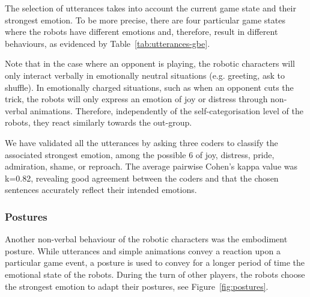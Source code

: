The selection of utterances takes into account the current game state and their strongest emotion. To be more precise, there are four particular game states where the robots have different emotions and, therefore, result in different behaviours, as evidenced by Table~\ref{tab:utterances-gbe}. 

Note that in the case where an opponent is playing, the robotic characters will only interact verbally in emotionally neutral situations (e.g. greeting, ask to shuffle). In emotionally charged situations, such as when an opponent cuts the trick, the robots will only express an emotion of joy or distress through non-verbal animations. Therefore, independently of the self-categorisation level of the robots, they react similarly towards the out-group.



We have validated all the utterances by asking three coders to classify the associated strongest emotion, among the possible 6 of joy, distress, pride, admiration, shame, or reproach. The average pairwise Cohen's kappa value was k=0.82, revealing good agreement between the coders and that the chosen sentences accurately reflect their intended emotions.

\subsubsection{Postures}

Another non-verbal behaviour of the robotic characters was the embodiment posture. While utterances and simple animations convey a reaction upon a particular game event, a posture is used to convey for a longer period of time the emotional state of the robots. During the turn of other players, the robots choose the strongest emotion to adapt their postures, see Figure~\ref{fig:postures}.

